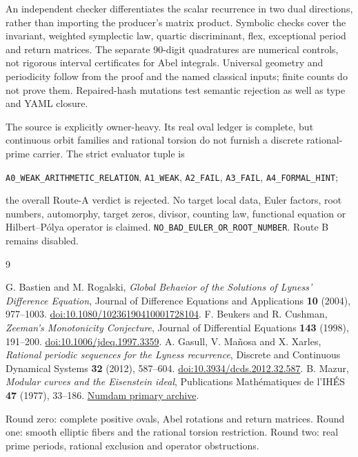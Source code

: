 \documentclass[10pt]{article}
\begin{document}
An independent checker differentiates the scalar recurrence in two dual
directions, rather than importing the producer's matrix product.
Symbolic checks cover the invariant, weighted symplectic law, quartic
discriminant, flex, exceptional period and return matrices. The separate
90-digit quadratures are numerical controls, not rigorous interval
certificates for Abel integrals. Universal geometry and periodicity
follow from the proof and the named classical inputs; finite counts do
not prove them. Repaired-hash mutations test semantic rejection as well
as type and YAML closure.

\begin{samepage}
\raggedright
The source is explicitly owner-heavy. Its real oval ledger is complete,
but continuous orbit families and rational torsion do not furnish a
discrete rational-prime carrier. The strict evaluator tuple is
\par\noindent
\texttt{A0\_WEAK\_ARITHMETIC\_RELATION}, \texttt{A1\_WEAK},
\texttt{A2\_FAIL}, \texttt{A3\_FAIL}, \texttt{A4\_FORMAL\_HINT};
\par\noindent
the overall Route-A verdict is rejected. No target local data, Euler
factors, root numbers, automorphy, target zeros, divisor, counting law,
functional equation or Hilbert--Pólya operator is claimed.
\texttt{NO\_BAD\_EULER\_OR\_ROOT\_NUMBER}. Route B remains disabled.
\end{samepage}

\begin{thebibliography}{9}\raggedright
{} G. Bastien and M. Rogalski,
\emph{Global Behavior of the Solutions of Lyness' Difference Equation},
Journal of Difference Equations and Applications \textbf{10} (2004), 977--1003.
\href{https://doi.org/10.1080/10236190410001728104}{doi:10.1080/10236190410001728104}.
 F. Beukers and R. Cushman,
\emph{Zeeman's Monotonicity Conjecture}, Journal of Differential Equations
\textbf{143} (1998), 191--200.
\href{https://doi.org/10.1006/jdeq.1997.3359}{doi:10.1006/jdeq.1997.3359}.
 A. Gasull, V. Mañosa and X. Xarles,
\emph{Rational periodic sequences for the Lyness recurrence},
Discrete and Continuous Dynamical Systems \textbf{32} (2012), 587--604.
\href{https://doi.org/10.3934/dcds.2012.32.587}{doi:10.3934/dcds.2012.32.587}.
 B. Mazur, \emph{Modular curves and the Eisenstein ideal},
Publications Mathématiques de l'IHÉS \textbf{47} (1977), 33--186.
\href{https://www.numdam.org/item/PMIHES_1977__47__33_0/}{Numdam primary archive}.
\end{thebibliography}
\medskip\noindent\small
\ifcase\CRevisionRound
Round zero: complete positive ovals, Abel rotations and return matrices.
\or
Round one: smooth elliptic fibers and the rational torsion restriction.
\else
Round two: real prime periods, rational exclusion and operator obstructions.
\fi
\end{document}
